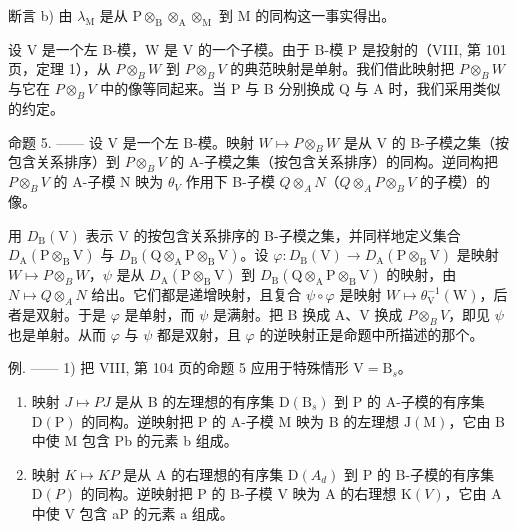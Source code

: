 断言 b) 由 \(\lambda_{\mathrm{M}}\) 是从 \(\mathrm{P} \otimes_{\mathrm{B}} \otimes_{\mathrm{A}} \otimes_{\mathrm{M}}\) 到 \(\mathrm{M}\) 的同构这一事实得出。

设 V 是一个左 B-模，W 是 V 的一个子模。由于 B-模 P 是投射的（VIII, 第 101 页，定理 1），从 \(P \otimes_{B} W\) 到 \(P \otimes_{B} V\) 的典范映射是单射。我们借此映射把 \(P \otimes_{B} W\) 与它在 \(P \otimes_{B} V\) 中的像等同起来。当 P 与 B 分别换成 Q 与 A 时，我们采用类似的约定。

命题 5. —— 设 V 是一个左 B-模。映射 \(W \mapsto P \otimes_{B} W\) 是从 V 的 B-子模之集（按包含关系排序）到 \(P \otimes_{B} V\) 的 A-子模之集（按包含关系排序）的同构。逆同构把 \(P \otimes_{B} V\) 的 A-子模 N 映为 \(\theta_{V}\) 作用下 B-子模 \(Q \otimes_{A} N\)（\(Q \otimes_{A} P \otimes_{B} V\) 的子模）的像。

用 \(D_{\mathrm{B}}(\mathrm{V})\) 表示 V 的按包含关系排序的 B-子模之集，并同样地定义集合 \(D_{\mathrm{A}}(\mathrm{P}\otimes_{\mathrm{B}}\mathrm{V})\) 与 \(D_{\mathrm{B}}(\mathrm{Q}\otimes_{\mathrm{A}}\mathrm{P}\otimes_{\mathrm{B}}\mathrm{V})\)。设 \(\varphi:D_{\mathrm{B}}(\mathrm{V})\to D_{\mathrm{A}}(\mathrm{P}\otimes_{\mathrm{B}}\mathrm{V})\) 是映射 \(W\mapsto P\otimes_{B}W\)，\(\psi\) 是从 \(D_{\mathrm{A}}(\mathrm{P}\otimes_{\mathrm{B}}\mathrm{V})\) 到 \(D_{\mathrm{B}}(\mathrm{Q}\otimes_{\mathrm{A}}\mathrm{P}\otimes_{\mathrm{B}}\mathrm{V})\) 的映射，由 \(N\mapsto Q\otimes_{A}N\) 给出。它们都是递增映射，且复合 \(\psi\circ\varphi\) 是映射 \(W\mapsto\theta_{\mathrm{V}}^{-1}(\mathrm{W})\)，后者是双射。于是 \(\varphi\) 是单射，而 \(\psi\) 是满射。把 B 换成 A、V 换成 \(P\otimes_{B}V\)，即见 \(\psi\) 也是单射。从而 \(\varphi\) 与 \(\psi\) 都是双射，且 \(\varphi\) 的逆映射正是命题中所描述的那个。

例. —— 1) 把 VIII, 第 104 页的命题 5 应用于特殊情形 \(\mathrm{V} = \mathrm{B}_s\)。

\begin{enumerate}
\def\labelenumi{\alph{enumi})}
\item
  映射 \(J \mapsto PJ\) 是从 B 的左理想的有序集 \(\mathrm{D}(\mathrm{B}_{s})\) 到 P 的 A-子模的有序集 \(\mathrm{D}(\mathrm{P})\) 的同构。逆映射把 P 的 A-子模 M 映为 B 的左理想 \(\mathrm{J}(\mathrm{M})\)，它由 B 中使 M 包含 Pb 的元素 b 组成。
\item
  映射 \(K \mapsto KP\) 是从 A 的右理想的有序集 \(\mathrm{D}(A_{d})\) 到 P 的 B-子模的有序集 \(\mathrm{D}(P)\) 的同构。逆映射把 P 的 B-子模 V 映为 A 的右理想 \(\mathrm{K}(V)\)，它由 A 中使 V 包含 aP 的元素 a 组成。
\end{enumerate}

